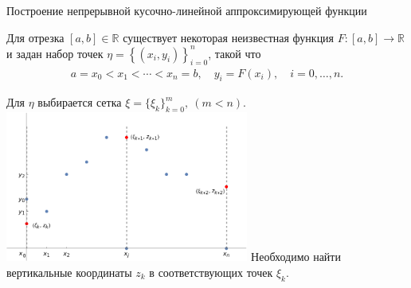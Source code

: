 \documentclass[ignoreonframetext,unicode]{beamer}
\begin{document}



\begin{frame}{Построение непрерывной кусочно-линейной аппроксимирующей функции}
	\small
	
	Для отрезка $[a, b] \in \mathbb{R}$ существует
	некоторая неизвестная функция $F\!: [a, b]  \rightarrow \mathbb{R}$ и 
	задан набор точек  $\eta = \left\{(x_i, y_i) \right\}_{i=0}^{n}$, такой что
	\vspace*{-2.mm}
	\begin{gather*}
		a = x_0 < x_1 < \cdots < x_n = b, \quad y_i  = F(x_i), \quad i = 0, \dots, n.
	\end{gather*}
	
	\vspace*{-2.mm}
	Для $\eta$ выбирается сетка 
	$\xi = \{\xi_k\}_{k=0}^{m}, \ (m < n).$
	\center
	\includegraphics[width=0.6\textwidth]{illustr_spline.png}
	\vspace*{-2.mm}
	\flushleft
	Необходимо найти вертикальные координаты $z_k$ в соответствующих точек $\xi_k$.
	\normalsize
\end{frame}

	
	
\end{document}
